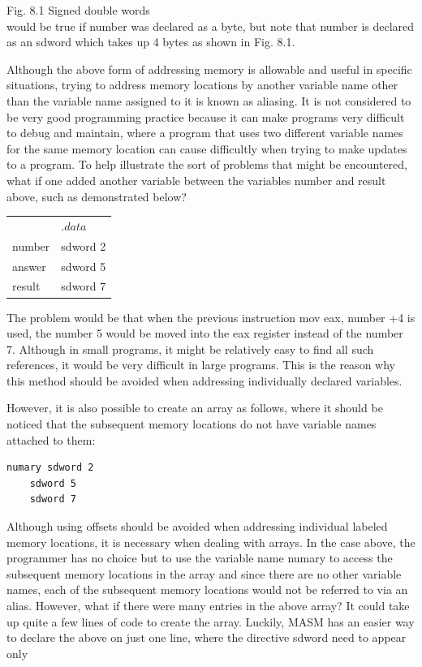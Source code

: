 \documentclass[10pt]{book}
\begin{document}
Fig. 8.1 Signed double words\\
would be true if number was declared as a byte, but note that number is declared as an sdword which takes up 4 bytes as shown in Fig. 8.1.

Although the above form of addressing memory is allowable and useful in specific situations, trying to address memory locations by another variable name other than the variable name assigned to it is known as aliasing. It is not considered to be very good programming practice because it can make programs very difficult to debug and maintain, where a program that uses two different variable names for the same memory location can cause difficultly when trying to make updates to a program. To help illustrate the sort of problems that might be encountered, what if one added another variable between the variables number and result above, such as demonstrated below?

\begin{center}
\begin{tabular}{ll}
 & .$d a t a$ \\
number & sdword 2 \\
answer & sdword 5 \\
result & sdword 7 \\
\end{tabular}
\end{center}

The problem would be that when the previous instruction mov eax, number +4 is used, the number 5 would be moved into the eax register instead of the number 7. Although in small programs, it might be relatively easy to find all such references, it would be very difficult in large programs. This is the reason why this method should be avoided when addressing individually declared variables.

However, it is also possible to create an array as follows, where it should be noticed that the subsequent memory locations do not have variable names attached to them:

\begin{verbatim}
numary sdword 2
    sdword 5
    sdword 7
\end{verbatim}

Although using offsets should be avoided when addressing individual labeled memory locations, it is necessary when dealing with arrays. In the case above, the programmer has no choice but to use the variable name numary to access the subsequent memory locations in the array and since there are no other variable names, each of the subsequent memory locations would not be referred to via an alias. However, what if there were many entries in the above array? It could take up quite a few lines of code to create the array. Luckily, MASM has an easier way to declare the above on just one line, where the directive sdword need to appear only
\end{document}
